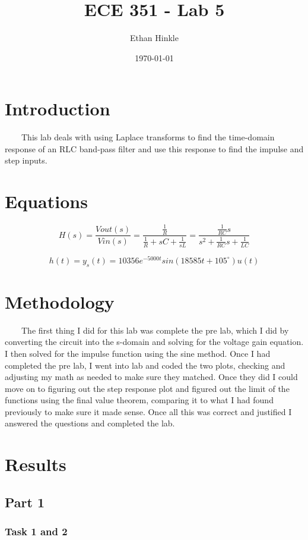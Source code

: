 \documentclass[11pt,a4]{article}
\title{ECE 351 - Lab 5}
\author{Ethan Hinkle}
\date{\today}
\begin{document}
\maketitle

\section{Introduction}
\ \ \ \ This lab deals with using Laplace transforms to find the time-domain response of an RLC band-pass filter and use this response to find the impulse and step inputs.

\section{Equations}

$$H(s)=\frac{Vout(s)}{Vin(s)} = \frac{\frac{1}{R}}{\frac{1}{R} + sC + \frac{1}{sL}} = \frac{\frac{1}{RC}s}{s^{2}+\frac{1}{RC}s + \frac{1}{LC}}$$

$$h(t) = y_{s}(t)=10356e^{-5000t}sin(18585t+105^{\circ})u(t)$$

\section{Methodology}
\ \ \ \ The first thing I did for this lab was complete the pre lab, which I did by converting the circuit into the s-domain and solving for the voltage gain equation. I then solved for the impulse function using the sine method. Once I had completed the pre lab, I went into lab and coded the two plots, checking and adjusting my math as needed to make sure they matched. Once they did I could move on to figuring out the step response plot and figured out the limit of the functions using the final value theorem, comparing it to what I had found previously to make sure it made sense. Once all this was correct and justified I answered the questions and completed the lab.

\section{Results}

\subsection{Part 1}

\subsubsection{Task 1 and 2}
\end{document}
